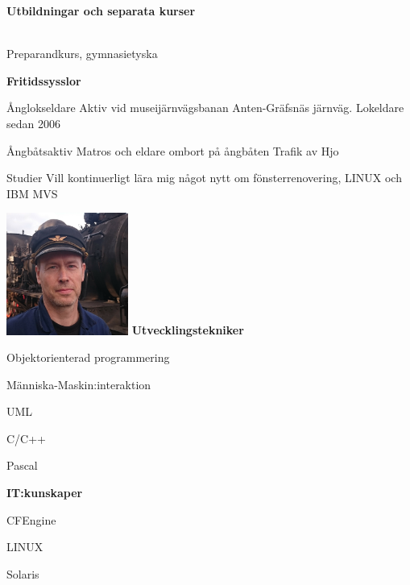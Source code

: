 \documentclass[a4paper,swedish,10pt]{article}
\newenvironment*{descriptioncv}[1]%
{%
  \textbf{\Large #1}%
  \begin{description}[nosep,font=\sffamily\bfseries, leftmargin=0.5cm, style=nextline]%
  }%
  {\end{description}\vspace{0.4cm}}
\newcommand*{\cvitem}[3]{\item[#1]{\cinzel#2}\\#3}
\begin{document}
\begin{minipage}[t]{0.745\textwidth}
\begin{descriptioncv}{Utbildningar och separata kurser}
    \cvitem{Tyska, Högskolan i Skövde}{2007}{Preparandkurs, gymnasietyska}
  \end{descriptioncv}
  \begin{descriptioncv}{Fritidssysslor}
  \item[Ånglokseldare]Aktiv vid museijärnvägsbanan Anten-Gräfsnäs järnväg. Lokeldare sedan 2006
  \item[Ångbåtsaktiv]Matros och eldare ombort på ångbåten Trafik av Hjo
  \item[Studier]Vill kontinuerligt lära mig något nytt om fönsterrenovering, LINUX och IBM MVS
  \end{descriptioncv}
\end{minipage}
\begin{minipage}[t]{0.27\textwidth}
  \raggedleft%
  \vspace{-\topskip}
  \includegraphics[height=4cm]{bild.jpg}
  \textbf{Utvecklingstekniker}
  \begin{description}[nosep]
    \raggedleft\setlength\itemsep{0.1ex}\small%
  \item Objektorienterad programmering
  \item Människa-Maskin:interaktion
  \item UML
  \item C/C++
  \item Pascal
  \end{description}
  \vspace{0.5cm}
  \textbf{IT:kunskaper}
  \begin{description}[nosep]
    \raggedleft\setlength\itemsep{0.1ex}\small%
  \item CFEngine
  \item LINUX
  \item Solaris

\end{description}
\end{minipage}
\end{document}
